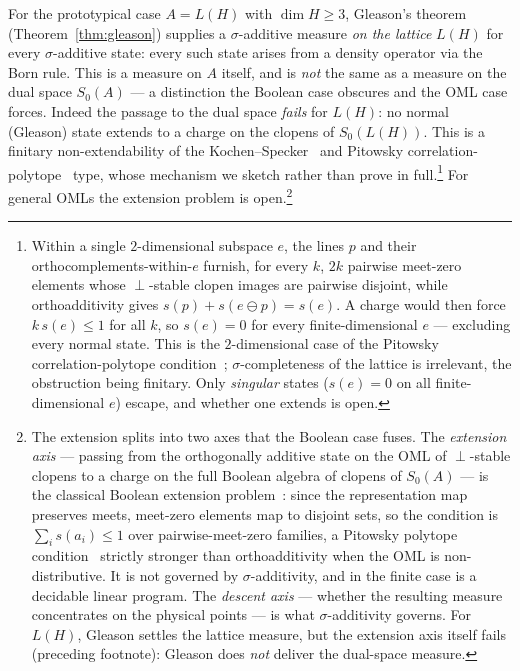For the prototypical case $A = L(H)$ with $\dim H \geq 3$,
Gleason's theorem (Theorem~\ref{thm:gleason}) supplies a
$\sigma$-additive measure \emph{on the lattice} $L(H)$ for every
$\sigma$-additive state: every such state arises from a density
operator via the Born rule.  This is a measure on $A$ itself, and is
\emph{not} the same as a measure on the dual space $S_0(A)$ --- a
distinction the Boolean case obscures and the OML case forces.  Indeed
the passage to the dual space \emph{fails} for $L(H)$: no normal
(Gleason) state extends to a charge on the clopens of $S_0(L(H))$.  This
is a finitary non-extendability of the
Kochen--Specker~\cite{KochenSpecker1967} and Pitowsky
correlation-polytope~\cite{Pitowsky1989} type, whose mechanism we
sketch rather than prove in full.\footnote{%
Within a single $2$-dimensional subspace $e$, the lines
$p$ and their orthocomplements-within-$e$ furnish, for every $k$,
$2k$ pairwise meet-zero elements whose $\perp$-stable clopen images are
pairwise disjoint, while orthoadditivity gives
$s(p) + s(e \ominus p) = s(e)$.  A charge would then force
$k\,s(e) \leq 1$ for all $k$, so $s(e) = 0$ for every
finite-dimensional $e$ --- excluding every normal state.  This is the
$2$-dimensional case of the Pitowsky correlation-polytope
condition~\cite{Pitowsky1989}; $\sigma$-completeness of the lattice is
irrelevant, the obstruction being finitary.  Only \emph{singular} states
($s(e) = 0$ on all finite-dimensional $e$) escape, and whether one
extends is open.}  For general OMLs the extension problem is
open.\footnote{The extension splits into two axes that the Boolean
case fuses.  The \emph{extension axis} --- passing from the
orthogonally additive state on the OML of $\perp$-stable clopens to
a charge on the full Boolean algebra of clopens of $S_0(A)$ --- is
the classical Boolean extension problem~\cite{HornTarski1948}: since
the representation map preserves meets, meet-zero elements map to
disjoint sets, so the condition is $\sum_i s(a_i) \leq 1$ over
pairwise-meet-zero families, a Pitowsky polytope
condition~\cite{Pitowsky1989} strictly stronger than orthoadditivity
when the OML is non-distributive.  It is not governed by
$\sigma$-additivity, and in the finite case is a decidable linear
program.  The \emph{descent axis} --- whether the resulting measure
concentrates on the physical points --- is what $\sigma$-additivity
governs.  For $L(H)$, Gleason settles the lattice measure, but the
extension axis itself fails (preceding footnote): Gleason does
\emph{not} deliver the dual-space measure.}

